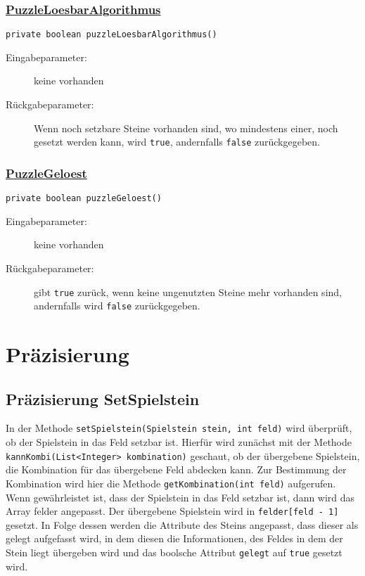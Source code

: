 \subsubsection{\underline{PuzzleLoesbarAlgorithmus}}
\lstinline{private boolean puzzleLoesbarAlgorithmus()}
\begin{description}
	\item [Eingabeparameter:] keine vorhanden
	\item [Rückgabeparameter:] Wenn noch setzbare Steine vorhanden sind, wo mindestens einer, noch gesetzt werden kann, wird \lstinline{true}, andernfalls \lstinline{false} zurückgegeben.
\end{description}

\subsubsection{\underline{PuzzleGeloest}}
\lstinline{private boolean puzzleGeloest()}
\begin{description}
	\item [Eingabeparameter:] keine vorhanden
	\item [Rückgabeparameter:] gibt \lstinline{true} zurück, wenn keine ungenutzten Steine mehr vorhanden sind, andernfalls wird \lstinline{false} zurückgegeben.
\end{description}

\clearpage
\section{Präzisierung}
\subsection{Präzisierung SetSpielstein}
In der Methode \lstinline{setSpielstein(Spielstein stein, int feld)} wird überprüft, ob der Spielstein in das Feld setzbar ist. Hierfür wird zunächst mit der Methode \\  \lstinline{kannKombi(List<Integer> kombination)} geschaut, ob der übergebene Spielstein, die Kombination für das übergebene Feld abdecken kann. Zur Bestimmung der Kombination wird hier die Methode \lstinline{getKombination(int feld)} aufgerufen.
Wenn gewährleistet ist, dass der Spielstein in das Feld setzbar ist, dann wird das Array felder angepasst. Der übergebene Spielstein wird in \lstinline{felder[feld - 1]} gesetzt. In Folge dessen werden die Attribute des Steins angepasst, dass dieser als gelegt aufgefasst wird, in dem diesen die Informationen, des Feldes in dem der Stein liegt übergeben wird und das boolsche Attribut \lstinline{gelegt} auf \lstinline{true} gesetzt wird.
\clearpage

